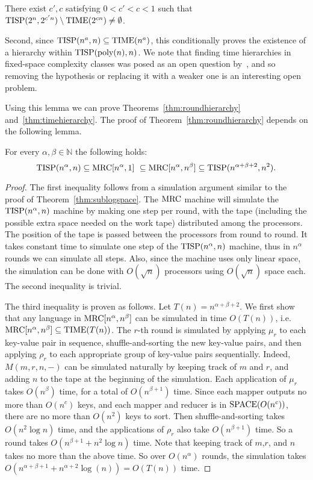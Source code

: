 \begin{conjecture} \label{conj:weaketh}
There exist $c',c$ satisfying $0 < c' < c < 1$ such that
$\textup{TISP}(2^n, 2^{c'n}) \setminus \textup{TIME}(2^{cn})\ne\emptyset$.
\end{conjecture}

Second, since $\textup{TISP}(n^a, n) \subseteq \textup{TIME}(n^a)$, this conditionally proves the
existence of a hierarchy within $\textup{TISP}(\textup{poly}(n), n)$. We note that
finding time hierarchies in fixed-space complexity classes was posed as an open
question by~\cite{WagnerW86}, and so removing the hypothesis or replacing it
with a weaker one is an interesting open problem.

Using this lemma we can prove Theorems~\ref{thm:roundhierarchy}
and~\ref{thm:timehierarchy}. The proof of Theorem~\ref{thm:roundhierarchy}
depends on the following lemma.

\begin{lemma} \label{lem:tisprelation}
For every $\alpha, \beta \in \mathbb N$ the following holds: $$ \textup{TISP}(n^\alpha,
n)  \subseteq \textup{MRC}[n^\alpha, 1] \ \subseteq \textup{MRC}[n^\alpha, n^\beta] \subseteq
\textup{TISP}(n^{\alpha+\beta+2}, n^2).$$
\end{lemma}

\begin{proof} The first inequality follows from a simulation argument similar
to the proof of Theorem~\ref{thm:sublogspace}. The $\textup{MRC}$ machine will simulate
the $\textup{TISP}(n^\alpha,n)$ machine by making one step per round, with the tape
(including the possible extra space needed on the work tape) distributed among
the processors.  The position of the tape is passed between the processors from
round to round.  It takes constant time to simulate one step of the
$\textup{TISP}(n^\alpha,n)$ machine, thus in $n^\alpha$ rounds we can simulate all
steps.  Also, since the machine uses only linear space, the simulation can be
done with $O(\sqrt{n})$ processors using $O(\sqrt{n})$ space each.  The second
inequality is trivial.

The third inequality is proven as follows. Let $T(n) = n^{\alpha+\beta+2}$.
We first show that any language in $\textup{MRC}[n^\alpha,n^\beta]$ can be simulated in
time $O(T(n))$, i.e. $\textup{MRC}[n^\alpha,n^\beta] \subseteq \textup{TIME}(T(n))$. The $r$-th
round is simulated by applying $\mu_r$ to each key-value pair in sequence,
shuffle-and-sorting the new key-value pairs, and then applying $\rho_r$ to each
appropriate group of key-value pairs sequentially. Indeed, $M(m,r,n,-)$ can be
simulated naturally by keeping track of $m$ and $r$, and adding $n$ to the tape
at the beginning of the simulation. Each application of $\mu_r$ takes
$O(n^\beta)$ time, for a total of $O(n^{\beta+1})$ time. Since each mapper
outputs no more than $O(n^c)$ keys, and each mapper and reducer is in
$\textup{SPACE}(O(n^c))$, there are no more than $O(n^2)$ keys to sort. Then
shuffle-and-sorting takes $O(n^2 \log n)$ time, and the applications of
$\rho_r$ also take $O(n^{\beta+1})$ time. So a round takes $O(n^{\beta+1} +
n^2 \log n)$ time. Note that keeping track of $m$,$r$, and $n$ takes no more
than the above time. So over $O(n^\alpha)$ rounds, the simulation takes
$O(n^{\alpha+\beta+1}+n^{\alpha+2} \log(n))=O(T(n))$ time. \end{proof}


